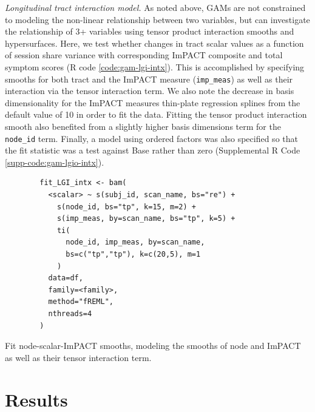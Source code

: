 \documentclass[12pt]{article}
\begin{document}
\textit{Longitudinal tract interaction model.} As noted above, GAMs are not constrained to modeling the non-linear relationship between two variables, but can investigate the relationship of 3+ variables using tensor product interaction smooths and hypersurfaces. Here, we test whether changes in tract scalar values as a function of session share variance with corresponding ImPACT composite and total symptom scores (R code \ref{code:gam-lgi-intx}). This is accomplished by specifying smooths for both tract and the ImPACT measure (\lstinline{imp_meas}) as well as their interaction via the tensor interaction term. We also note the decrease in basis dimensionality for the ImPACT measures thin-plate regression splines from the default value of 10 in order to fit the data. Fitting the tensor product interaction smooth also benefited from a slightly higher basis dimensions term for the \lstinline{node_id} term. Finally, a model using ordered factors was also specified so that the fit statistic was a test against Base rather than zero (Supplemental R Code \ref{supp-code:gam-lgio-intx}).

\begin{equ}[H]
	\begin{lstlisting}
		fit_LGI_intx <- bam(
		  <scalar> ~ s(subj_id, scan_name, bs="re") +
		    s(node_id, bs="tp", k=15, m=2) +
			s(imp_meas, by=scan_name, bs="tp", k=5) +
			ti(
			  node_id, imp_meas, by=scan_name,
			  bs=c("tp","tp"), k=c(20,5), m=1
			)
		  data=df,
		  family=<family>,
		  method="fREML",
		  nthreads=4
		)
	\end{lstlisting}
	\caption{Fit node-scalar-ImPACT smooths, modeling the smooths of node and ImPACT as well as their tensor interaction term.}
	\label{code:gam-lgi-intx}
\end{equ}



\section{Results}
\label{sec:res}
\end{document}
